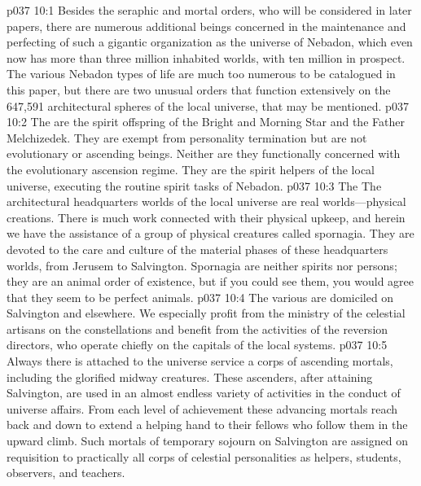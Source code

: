 \vs p037 10:1 Besides the seraphic and mortal orders, who will be considered in later papers, there are numerous additional beings concerned in the maintenance and perfecting of such a gigantic organization as the universe of Nebadon, which even now has more than three million inhabited worlds, with ten million in prospect. The various Nebadon types of life are much too numerous to be catalogued in this paper, but there are two unusual orders that function extensively on the 647,591 architectural spheres of the local universe, that may be mentioned.\plusone
\pc \vs p037 10:2 The  are the spirit offspring of the Bright and Morning Star and the Father Melchizedek. They are exempt from personality termination but are not evolutionary or ascending beings. Neither are they functionally concerned with the evolutionary ascension regime. They are the spirit helpers of the local universe, executing the routine spirit tasks of Nebadon.
\pc \vs p037 10:3 The  The architectural headquarters worlds of the local universe are real worlds---physical creations. There is much work connected with their physical upkeep, and herein we have the assistance of a group of physical creatures called spornagia. They are devoted to the care and culture of the material phases of these headquarters worlds, from Jerusem to Salvington. Spornagia are neither spirits nor persons; they are an animal order of existence, but if you could see them, you would agree that they seem to be perfect animals.
\pc \vs p037 10:4 The various  are domiciled on Salvington and elsewhere. We especially profit from the ministry of the celestial artisans on the constellations and benefit from the activities of the reversion directors, who operate chiefly on the capitals of the local systems.
\vs p037 10:5 Always there is attached to the universe service a corps of ascending mortals, including the glorified midway creatures. These ascenders, after attaining Salvington, are used in an almost endless variety of activities in the conduct of universe affairs. From each level of achievement these advancing mortals reach back and down to extend a helping hand to their fellows who follow them in the upward climb. Such mortals of temporary sojourn on Salvington are assigned on requisition to practically all corps of celestial personalities as helpers, students, observers, and teachers.
